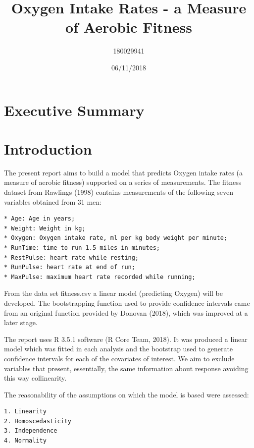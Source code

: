 \documentclass[]{article}
\title{Oxygen Intake Rates - a Measure of Aerobic Fitness}
\author{180029941}
\date{06/11/2018}
\begin{document}
\maketitle

{
\setcounter{tocdepth}{2}
\tableofcontents
}
\pagebreak

\section{Executive Summary}\label{executive-summary}

\pagebreak

\section{Introduction}\label{introduction}

The present report aims to build a model that predicts Oxygen intake
rates (a measure of aerobic fitness) supported on a series of
measurements. The fitness dataset from Rawlings (1998) contains
measurements of the following seven variables obtained from 31 men:

\begin{verbatim}
* Age: Age in years;  
* Weight: Weight in kg;  
* Oxygen: Oxygen intake rate, ml per kg body weight per minute;  
* RunTime: time to run 1.5 miles in minutes;
* RestPulse: heart rate while resting;  
* RunPulse: heart rate at end of run;  
* MaxPulse: maximum heart rate recorded while running; 
\end{verbatim}

From the data set fitness.csv a linear model (predicting Oxygen) will be
developed. The bootstrapping function used to provide confidence
intervals came from an original function provided by Donovan (2018),
which was improved at a later stage.

The report uses R 3.5.1 software (R Core Team, 2018). It was produced a
linear model which was fitted in each analysis and the bootstrap used to
generate confidence intervals for each of the covariates of interest. We
aim to exclude variables that present, essentially, the same information
about response avoiding this way collinearity.

The reasonability of the assumptions on which the model is based were
assessed:

\begin{verbatim}
1. Linearity  
2. Homoscedasticity  
3. Independence  
4. Normality  
\end{verbatim}
\end{document}
